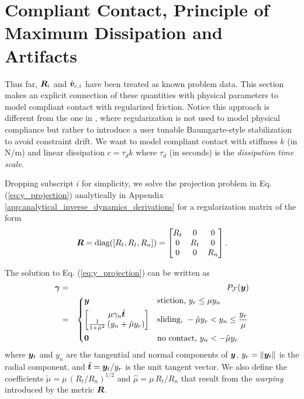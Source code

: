 
\section{Compliant Contact, Principle of Maximum Dissipation and Artifacts}
\label{sec:physical_intuition}

Thus far, ${\bm{R}}_i$ and $\hat{{\bm{v}}}_{c,i}$ have been treated as known problem
data. This section makes an explicit connection of these quantities with
physical parameters to model compliant contact with regularized friction. Notice
this approach is different from the one in \cite{bib:todorov2014}, where
regularization is not used to model physical compliance but rather to introduce
a user tunable Baumgarte-style stabilization to avoid constraint drift. We want
to model compliant contact with stiffness $k$ (in N/m) and linear
dissipation $c = \tau_d k$ where $\tau_d$ (in seconds) is the \textit{dissipation
time scale}. 

Dropping subscript $i$ for simplicity, we solve the projection problem in Eq.
(\ref{eq:y_projection}) analytically in Appendix
\ref{app:analytical_inverse_dynamics_derivations} for a regularization matrix of
the form
\begin{align}	
	\vf{R} = \text{diag}([R_t, R_t, R_n]) = 
	\begin{bmatrix}
		R_t &   0 & 0\\
		  0 & R_t & 0\\
		  0 &   0 & R_n
	\end{bmatrix}.
    \label{eq:Rk}
\end{align} 

The solution to  Eq. (\ref{eq:y_projection}) can be written as
\begin{eqnarray}
	\bgamma &=& P_\mathcal{F}(\vf{y})
    \label{eq:analytical_y_projection}\\
    &=&\begin{dcases}
	\vf{y} 
	& \text{stiction, } y_r \le \mu y_n\\
	\begin{bmatrix}
		\mu\gamma_n\hat{\vf{t}}\\
		\frac{1}{1+\tilde\mu^2}\left(y_n +
        \hat\mu y_r\right)
	\end{bmatrix}
	& \text{sliding, } -\hat\mu y_r < y_n \leq \frac{y_r}{\mu}\\
    \vf{0} & \text{no contact, } y_n < -\hat\mu y_r
\end{dcases}\nonumber	
\end{eqnarray}
where ${\bm{y}}_t$ and $y_n$ are the tangential and normal components of ${\bm{y}}$,
$y_r=\Vert{\bm{y}}_t\Vert$ is the radial component, and $\hat{{\bm{t}}}={\bm{y}}_t/y_r$
is the unit tangent vector. We also define the coefficients
$\tilde\mu=\mu\,(R_t/R_n)^{1/2}$ and $\hat\mu=\mu\,R_t/R_n$ that
result from the \textit{warping} introduced by the metric ${\bm{R}}$.

